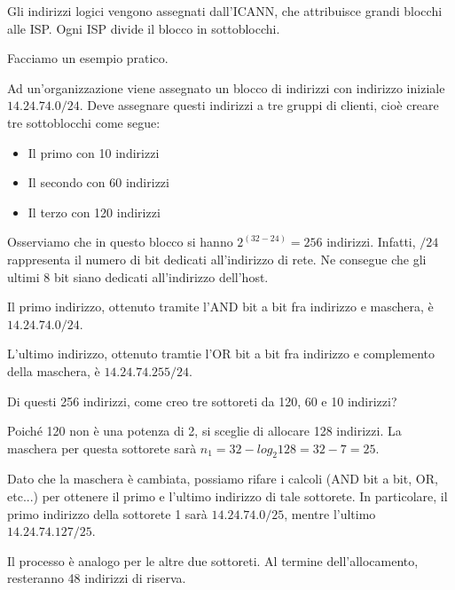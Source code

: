         Gli indirizzi logici vengono assegnati dall'ICANN, che attribuisce grandi blocchi alle ISP. Ogni ISP divide il blocco in sottoblocchi.
        
        \vspace{3mm}
        
        Facciamo un esempio pratico.
        
        Ad un'organizzazione viene assegnato un blocco di indirizzi con indirizzo iniziale $14.24.74.0/24$. Deve assegnare questi indirizzi a tre gruppi di clienti, cioè creare tre sottoblocchi come segue:
        
        \begin{itemize}
            \item Il primo con 10 indirizzi
            \item Il secondo con 60 indirizzi
            \item Il terzo con 120 indirizzi
        \end{itemize}
        
        Osserviamo che in questo blocco si hanno $2^(32-24)=256$ indirizzi. Infatti, $/24$ rappresenta il numero di bit dedicati all'indirizzo di rete. Ne consegue che gli ultimi 8 bit siano dedicati all'indirizzo dell'host.
        
        Il primo indirizzo, ottenuto tramite l'AND bit a bit fra indirizzo e maschera, è $14.24.74.0/24$.
        
        L'ultimo indirizzo, ottenuto tramtie l'OR bit a bit fra indirizzo e complemento della maschera, è $14.24.74.255/24$.
        
        Di questi 256 indirizzi, come creo tre sottoreti da 120, 60 e 10 indirizzi?
        
        \vspace{3mm}
        
        Poiché 120 non è una potenza di 2, si sceglie di allocare 128 indirizzi. La maschera per questa sottorete sarà $n_1 = 32-log_2 128 = 32 - 7 = 25$.
        
        Dato che la maschera è cambiata, possiamo rifare i calcoli (AND bit a bit, OR, etc...) per ottenere il primo e l'ultimo indirizzo di tale sottorete. In particolare, il primo indirizzo della sottorete 1 sarà $14.24.74.0/25$, mentre l'ultimo $14.24.74.127/25$.
        
        Il processo è analogo per le altre due sottoreti. Al termine dell'allocamento, resteranno 48 indirizzi di riserva.
        

